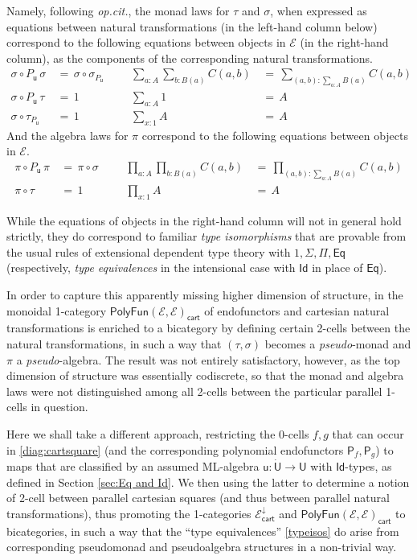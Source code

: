 \documentclass[12pt,reqno]{amsart}
\newcommand{\EE}{\ensuremath{\mathcal{E}}}
\newcommand{\alg}[1]{\ensuremath{\mathsf{#1}}}
\renewcommand{\to}{\ensuremath{\rightarrow}}
\newcommand{\Id}{\mathsf{Id}}
\renewcommand{\t}{\ensuremath{\mathsf{u}}}
\newcommand{\T}{\ensuremath{\mathsf{U}}}
\newcommand{\TT}{\ensuremath{\dot{\mathsf{U}}}}
\theoremstyle{remark}
\theoremstyle{definition}
\begin{document}
Namely, following \emph{op.cit.}, the monad laws for $\tau$ and $\sigma$, when expressed as equations between natural transformations (in the left-hand column below) correspond to the following equations between objects in $\EE$ (in the right-hand column), as the components of the corresponding natural transformations.
\begin{align*}\textstyle
 \sigma\circ P_\t\, \sigma\, &=\, \sigma\circ\sigma_{P_\t}	&&&	\sum\limits_{a:A}\sum\limits_{b:B(a)}C(a,b)\, &=\, \sum\limits_{(a,b):\sum\limits_{a:A}B(a)}C(a,b)\  \\ 
  \sigma\circ P_\t\,\tau\, &=\, 1 		&&& 	\sum\limits_{a:A}1\, &=\, A   \tag{\theequation}\label{typeisos}\\ 
  \sigma\circ \tau_{P_\t}\, &=\, 1		&&& 	\sum\limits_{x:1}A\, &=\, A  
 \end{align*}
%
And the algebra laws for $\pi$ correspond to the following equations between objects in $\EE$.
%
\begin{align*}
 \pi\circ P_\t\,\pi\, &=\,  \pi\circ\sigma 	&&&	\prod\limits_{a:A}\prod\limits_{b:B(a)}C(a,b)\, 
 									&=\, \prod\limits_{(a,b):\sum_{a:A}B(a)}C(a,b)  \\ 
 \pi\circ \tau\, &=\, 1 	&&& 	\prod\limits_{x:1}A\, &=\, A   \tag{\theequation}
\end{align*}

While the equations of objects in the right-hand column will not in general hold strictly, they do correspond to familiar \emph{type isomorphisms} that are provable from the usual rules of extensional dependent type theory with $1, \Sigma, \Pi, \mathsf{Eq}$ (respectively, \emph{type equivalences} in the intensional case with $\mathsf{Id}$ in place of $\mathsf{Eq}$). 

In order to capture this apparently missing higher dimension of structure, in \cite{Newstead:thesis, NA:2018} the monoidal 1-category $\mathsf{PolyFun}(\EE, \EE)_{\mathsf{cart}}$ of endofunctors and cartesian natural transformations is enriched to a bicategory by defining certain 2-cells between the natural transformations, in such a way that $(\tau, \sigma)$ becomes a \emph{pseudo}-monad and $\pi$ a \emph{pseudo}-algebra.  The result was not entirely satisfactory, however, as the top dimension of structure was essentially codiscrete, so that the monad and algebra laws were not distinguished among all 2-cells between the particular parallel 1-cells in question.

Here we shall take a different approach, restricting the 0-cells $f, g$ that can occur in \eqref{diag:cartsquare} (and the corresponding polynomial endofunctors $\alg{P}_f, \alg{P}_g$) to maps that are  classified by an assumed ML-algebra $\t:\TT \to \T$ with $\Id{}$-types, as defined in Section \ref{sec:Eq and Id}. We then using the latter to determine a notion of 2-cell between parallel cartesian squares (and thus between parallel natural transformations), thus promoting the 1-categories $\EE^{\downarrow}_{\mathsf{cart}}$ and $\mathsf{PolyFun}(\EE, \EE)_{\mathsf{cart}}$ to bicategories, in such a way that the ``type equivalences'' \eqref{typeisos} do arise from corresponding pseudomonad and pseudoalgebra structures in a non-trivial way.
\end{document}
